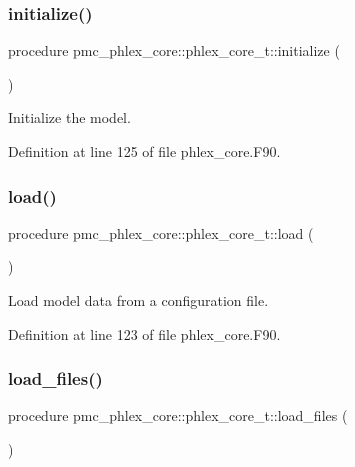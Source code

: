 \subsubsection{\texorpdfstring{initialize()}{initialize()}}
{\footnotesize\ttfamily procedure pmc\+\_\+phlex\+\_\+core\+::phlex\+\_\+core\+\_\+t\+::initialize (\begin{DoxyParamCaption}{ }\end{DoxyParamCaption})\hspace{0.3cm}{\ttfamily [private]}}



Initialize the model. 



Definition at line 125 of file phlex\+\_\+core.\+F90.

\mbox{\label{structpmc__phlex__core_1_1phlex__core__t_ae891a2e27ceea18851467c7d81f13df9}} 
\subsubsection{\texorpdfstring{load()}{load()}}
{\footnotesize\ttfamily procedure pmc\+\_\+phlex\+\_\+core\+::phlex\+\_\+core\+\_\+t\+::load (\begin{DoxyParamCaption}{ }\end{DoxyParamCaption})\hspace{0.3cm}{\ttfamily [private]}}



Load model data from a configuration file. 



Definition at line 123 of file phlex\+\_\+core.\+F90.

\mbox{\label{structpmc__phlex__core_1_1phlex__core__t_a0b265ff3c61b1dcb3adf39b9dccad15d}} 
\subsubsection{\texorpdfstring{load\+\_\+files()}{load\_files()}}
{\footnotesize\ttfamily procedure pmc\+\_\+phlex\+\_\+core\+::phlex\+\_\+core\+\_\+t\+::load\+\_\+files (\begin{DoxyParamCaption}{ }\end{DoxyParamCaption})\hspace{0.3cm}{\ttfamily [private]}}



